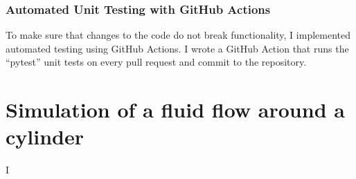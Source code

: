 \subsubsection{Automated Unit Testing with GitHub Actions}
To make sure that changes to the code do not break functionality, I implemented automated testing using GitHub Actions.
I wrote a GitHub Action that runs the ``pytest'' unit tests on every pull request and commit to the repository.

\section{Simulation of a fluid flow around a cylinder}
I 

